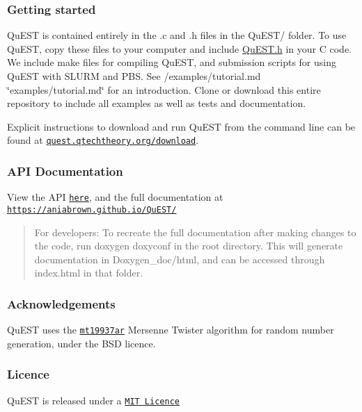 \subsubsection*{Getting started}

Qu\+E\+ST is contained entirely in the {\ttfamily .c} and {\ttfamily .h} files in the {\ttfamily Qu\+E\+S\+T/} folder. To use Qu\+E\+ST, copy these files to your computer and include {\ttfamily \mbox{\hyperlink{QuEST_8h}{Qu\+E\+S\+T.\+h}}} in your C code. We include make files for compiling Qu\+E\+ST, and submission scripts for using Qu\+E\+ST with S\+L\+U\+RM and P\+BS. See /examples/tutorial.md \char`\"{}examples/tutorial.\+md\char`\"{} for an introduction. Clone or download this entire repository to include all examples as well as tests and documentation.

Explicit instructions to download and run Qu\+E\+ST from the command line can be found at \href{https://quest.qtechtheory.org/download/}{\tt quest.\+qtechtheory.\+org/download}.

\subsubsection*{A\+PI Documentation}

View the A\+PI \href{https://aniabrown.github.io/QuEST/QuEST_8h.html}{\tt here}, and the full documentation at \href{https://aniabrown.github.io/QuEST/}{\tt https\+://aniabrown.\+github.\+io/\+Qu\+E\+S\+T/}

\begin{quote}
For developers\+: To recreate the full documentation after making changes to the code, run doxygen doxyconf in the root directory. This will generate documentation in Doxygen\+\_\+doc/html, and can be accessed through index.\+html in that folder. \end{quote}


\subsubsection*{Acknowledgements}

Qu\+E\+ST uses the \href{http://www.math.sci.hiroshima-u.ac.jp/~m-mat/MT/MT2002/emt19937ar.html}{\tt mt19937ar} Mersenne Twister algorithm for random number generation, under the B\+SD licence.

\subsubsection*{Licence}

Qu\+E\+ST is released under a \href{https://github.com/aniabrown/QuEST/blob/master/LICENCE.txt}{\tt M\+IT Licence} 